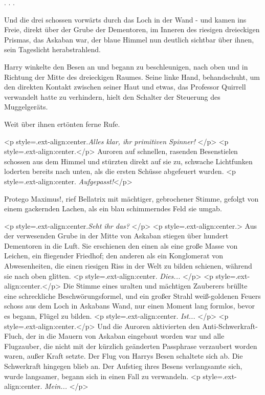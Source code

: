. . .

Und die drei schossen vorwärts durch das Loch in der Wand - und kamen ins Freie,
direkt über der Grube der Dementoren, im Inneren des riesigen dreieckigen
Prismas, das Askaban war, der blaue Himmel nun deutlich sichtbar über ihnen,
sein Tageslicht herabstrahlend.

Harry winkelte den Besen an und begann zu beschleunigen, nach oben und in
Richtung der Mitte des dreieckigen Raumes. Seine linke Hand, behandschuht, um
den direkten Kontakt zwischen seiner Haut und etwas, das Professor Quirrell
verwandelt hatte zu verhindern, hielt den Schalter der Steuerung des
Muggelgeräts.

Weit über ihnen ertönten ferne Rufe.

<p style=\grqq{}.ext-align:center\grqq{}.\emph{Alles klar, ihr primitiven
Spinner! }</p> <p style=\grqq{}.ext-align:center\grqq{}.</p> Auroren auf
schnellen, rasenden Besenstielen schossen aus dem Himmel und stürzten direkt auf
sie zu, schwache Lichtfunken loderten bereits nach unten, als die ersten Schüsse
abgefeuert wurden. <p style=\grqq{}.ext-align:center\grqq{}. \emph{
Aufgepasst!}</p>

\glqq Protego Maximus!\grqq{}, rief Bellatrix mit mächtiger, gebrochener Stimme,
gefolgt von einem gackernden Lachen, als ein blau schimmerndes Feld sie umgab.

<p style=\grqq{}.ext-align:center\grqq{}.\emph{Seht ihr das? }</p> <p
style=\grqq{}.ext-align:center\grqq{}.> Aus der verwesenden Grube in der Mitte
von Askaban stiegen über hundert Dementoren in die Luft. Sie erschienen den
einen als eine große Masse von Leichen, ein fliegender Friedhof; den anderen als
ein Konglomerat von Abwesenheiten, die einen riesigen Riss in der Welt zu bilden
schienen, während sie nach oben glitten. <p
style=\grqq{}.ext-align:center\grqq{}. \emph{ Dies... }</p> <p
style=\grqq{}.ext-align:center\grqq{}.</p> Die Stimme eines uralten und
mächtigen Zauberers brüllte eine schreckliche Beschwörungsformel, und ein großer
Strahl weiß-goldenen Feuers schoss aus dem Loch in Askabans Wand, nur einen
Moment lang formlos, bevor es begann, Flügel zu bilden. <p
style=\grqq{}.ext-align:center\grqq{}. \emph{Ist... }</p> <p
style=\grqq{}.ext-align:center\grqq{}.</p> Und die Auroren aktivierten den
Anti-Schwerkraft-Fluch, der in die Mauern von Askaban eingebaut worden war und
alle Flugzauber, die nicht mit der kürzlich geänderten Passphrase verzaubert
worden waren, außer Kraft setzte. Der Flug von Harrys Besen schaltete sich ab.
Die Schwerkraft hingegen blieb an. Der Aufstieg ihres Besens verlangsamte sich,
wurde langsamer, begann sich in einen Fall zu verwandeln. <p
style=\grqq{}.ext-align:center\grqq{}. \emph{Mein...} </p>

